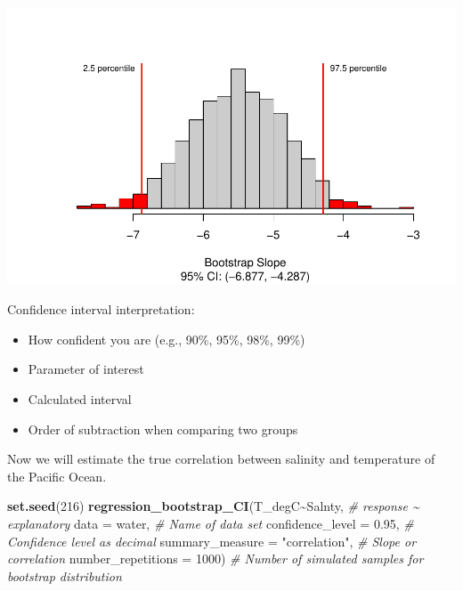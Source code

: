 \documentclass[
]{report}
\newenvironment{Shaded}{\begin{snugshade}}{\end{snugshade}}
\newcommand{\AttributeTok}[1]{\textcolor[rgb]{0.13,0.29,0.53}{#1}}
\newcommand{\CommentTok}[1]{\textcolor[rgb]{0.56,0.35,0.01}{\textit{#1}}}
\newcommand{\DecValTok}[1]{\textcolor[rgb]{0.00,0.00,0.81}{#1}}
\newcommand{\FloatTok}[1]{\textcolor[rgb]{0.00,0.00,0.81}{#1}}
\newcommand{\FunctionTok}[1]{\textcolor[rgb]{0.13,0.29,0.53}{\textbf{#1}}}
\newcommand{\NormalTok}[1]{#1}
\newcommand{\SpecialCharTok}[1]{\textcolor[rgb]{0.81,0.36,0.00}{\textbf{#1}}}
\newcommand{\StringTok}[1]{\textcolor[rgb]{0.31,0.60,0.02}{#1}}
\begin{document}
\begin{center}\includegraphics[width=0.7\linewidth]{13-LN013-regression_files/figure-latex/unnamed-chunk-15-1} \end{center}

Confidence interval interpretation:

\begin{itemize}
\item
  How confident you are (e.g., 90\%, 95\%, 98\%, 99\%)
\item
  Parameter of interest
\item
  Calculated interval
\item
  Order of subtraction when comparing two groups
\end{itemize}

\vspace{0.8in}

\newpage

Now we will estimate the true correlation between salinity and temperature of the Pacific Ocean.

\begin{Shaded}
\begin{Highlighting}[]
\FunctionTok{set.seed}\NormalTok{(}\DecValTok{216}\NormalTok{)}
\FunctionTok{regression\_bootstrap\_CI}\NormalTok{(T\_degC}\SpecialCharTok{\textasciitilde{}}\NormalTok{Salnty, }\CommentTok{\# response \textasciitilde{} explanatory}
   \AttributeTok{data =}\NormalTok{ water, }\CommentTok{\# Name of data set}
   \AttributeTok{confidence\_level =} \FloatTok{0.95}\NormalTok{, }\CommentTok{\# Confidence level as decimal}
   \AttributeTok{summary\_measure =} \StringTok{"correlation"}\NormalTok{, }\CommentTok{\# Slope or correlation}
   \AttributeTok{number\_repetitions =} \DecValTok{1000}\NormalTok{) }\CommentTok{\# Number of simulated samples for bootstrap distribution}
\end{Highlighting}
\end{Shaded}
\end{document}
